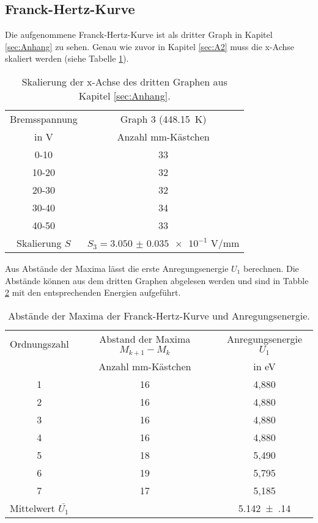 \subsection{Franck-Hertz-Kurve}
\label{sec:A3}

Die aufgenommene Franck-Hertz-Kurve ist als dritter Graph in Kapitel \ref{sec:Anhang} zu sehen.
Genau wie zuvor in Kapitel \ref{sec:A2} muss die x-Achse skaliert werden (siehe Tabelle \ref{tab:skal2}).
\begin{table}
  \centering
  \caption{Skalierung der x-Achse des dritten Graphen aus Kapitel \ref{sec:Anhang}.}
  \label{tab:skal2}
  \begin{tabular}{c c}
    \toprule
    Bremsspannung & Graph 3 (\SI{448,15}{\kelvin}) \\
    in V & Anzahl mm-Kästchen  \\
    \midrule
    0-10   &  33\\
    10-20  &  32\\
    20-30  &  32\\
    30-40  &  34\\
    40-50  &  33\\
    \bottomrule
    Skalierung $S$ & $S_3 = \num{3.050(35)e-1}$ V/mm  \\
  \end{tabular}
\end{table}
Aus Abstände der Maxima lässt die erste Anregungsenergie $U_1$ berechnen.
Die Abstände können aus dem dritten Graphen abgelesen werden und sind in Tabble \ref{tab:an} mit den entsprechenden Energien aufgeführt.
\begin{table}
  \centering
  \caption{Abstände der Maxima der Franck-Hertz-Kurve und Anregungsenergie.}
  \label{tab:an}
  \begin{tabular}{c c c}
    \toprule
    Ordnungszahl & Abstand der Maxima $M_{k+1} - M_k$ & Anregungsenergie $U_1$\\
    & Anzahl mm-Kästchen & in eV \\
    \midrule
    1 & 16 & 4,880 \\
    2 & 16 & 4,880 \\
    3 & 16 & 4,880 \\
    4 & 16 & 4,880 \\
    5 & 18 & 5,490 \\
    6 & 19 & 5,795 \\
    7 & 17 & 5,185 \\
    \bottomrule
    Mittelwert $\bar{U_1}$ & & \num{5.142(140)} \\
  \end{tabular}
\end{table}

